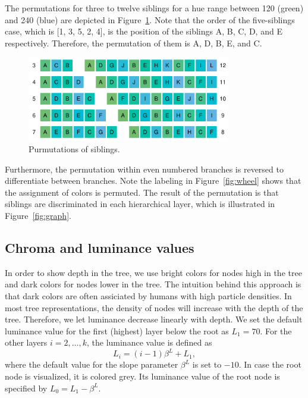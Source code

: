 \documentclass[journal]{vgtc}                %
\begin{document}
The permutations for three to twelve siblings for a hue range between 120 (green) and 240 (blue) are depicted in Figure~\ref{fig:perm}. Note that the order of the five-siblings case, which is [1, 3, 5, 2, 4], is the position of the siblings A, B, C, D, and E respectively. Therefore, the permutation of them is A, D, B, E, and C. 

\begin{figure}[htb]
  \centering
  \includegraphics[width=3.5in]{Permutations.pdf}
  \caption{Purmutations of siblings.}\label{fig:perm}
\end{figure}

Furthermore, the permutation within even numbered branches is reversed to differentiate between branches. Note the labeling in Figure~\ref{fig:wheel} shows that the assignment of colors is permuted. The result of the permutation is that siblings are discriminated in each hierarchical layer, which is illustrated in Figure~\ref{fig:graph}.


\subsection{Chroma and luminance values}

In order to show depth in the tree, we use bright colors for nodes high in the tree and dark colors for nodes lower in the tree. The intuition behind this approach is that dark colors are often assiciated by humans with high particle densities. In most tree representations, the density of nodes will increase with the depth of the tree. Therefore, we let luminance decrease linearly with depth.  We set the default luminance value for the first (highest) layer below the root as $L_1=70$. For the other layers $i=2,\ldots, k$, the luminance value is defined as
\begin{equation}
L_i=(i-1)\beta^L + L_1,
\end{equation}
where the default value for the slope parameter $\beta^L$ is set to $-10$. In case the root node is visualized, it is colored grey. Its luminance value of the root node is specified by $L_0=L_1-\beta^L$.
\end{document}
